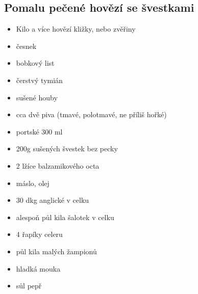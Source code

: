 \documentclass[10pt,a4paper]{article}
\newenvironment{myitemize}
{ \begin{itemize}
    \setlength{\itemsep}{0pt}
    \setlength{\parskip}{0pt}
    \setlength{\parsep}{0pt}     }
{ \end{itemize}                  }
\begin{document}
\subsection{Pomalu pečené hovězí se švestkami}
\begin{minipage}[t]{0,5\textwidth}
\begin{myitemize} 
\item Kilo a více hovězí kližky, nebo zvěřiny
\item česnek
\item bobkový list
\item čerstvý tymián
\item sušené houby
\item cca dvě piva (tmavé, polotmavé, ne příliš hořké)
\item portské 300 ml
\item 200g sušených švestek bez pecky
\item 2 lžíce balzamikového octa
\item máslo, olej
\item 30 dkg anglické v celku
\item alespoň půl kila šalotek v celku
\item 4 řapíky celeru
\item půl kila malých žampionů
\item hladká mouka
\item  sůl pepř
\end{myitemize}
\end{minipage}
\end{document}
